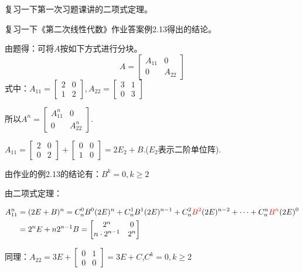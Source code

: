 \documentclass[a4paper]{report}
\begin{document}
\begin{jie}
复习一下\textcolor[rgb]{1.00,0.00,0.00}{第一次习题课}讲的\textcolor[rgb]{1.00,0.00,0.00}{二项式}定理。

复习一下《第二次线性代数》作业答案\textcolor[rgb]{1.00,0.00,0.00}{例2.13}得出的\textcolor[rgb]{1.00,0.00,0.00}{结论}。

由题得：可将$A$按如下方式进行分块。
\begin{equation*}
A=
\begin{bmatrix}
A_{11}&0\\
0&A_{22}
\end{bmatrix}
\end{equation*}
式中：$A_{11}=
\begin{bmatrix}
2&0\\
1&2
\end{bmatrix}
,A_{22}=
\begin{bmatrix}
3&1\\
0&3
\end{bmatrix}$

所以$A^n=
\begin{bmatrix}
A_{11}^n&0\\
0&A_{22}^n
\end{bmatrix}
$.

$A_{11} =
\begin{bmatrix}
2&0\\
0&2
\end{bmatrix}+
\begin{bmatrix}
0&0\\
1&0
\end{bmatrix}=2E_{2}+B
$.($E_{2}$表示二阶单位阵).

由作业的例2.13的结论有：$B^{k}=0,k\geq 2$

由二项式定理：

\begin{align*}
A_{11}^{n}&=(2E+B)^n=C_{n}^{0}B^{0}(2E)^{n}+C_{n}^{1}B^{1}(2E)^{n-1}+C_{n}^{2}\textcolor[rgb]{1.00,0.00,0.00}{B^{2}}(2E)^{n-2}+\cdots+C_{n}^{n}\textcolor[rgb]{1.00,0.00,0.00}{B^{n}}(2E)^{0}\\
&=2^nE+n2^{n-1}B=
\begin{bmatrix}
2^n&0\\
n\cdot2^{n-1}&2^n
\end{bmatrix}
\end{align*}

同理：$A_{22}=3E+
\begin{bmatrix}
0&1\\
0&0
\end{bmatrix}=3E+C
$,$C^{k}=0,k\geq2$


\end{jie}
\end{document}
